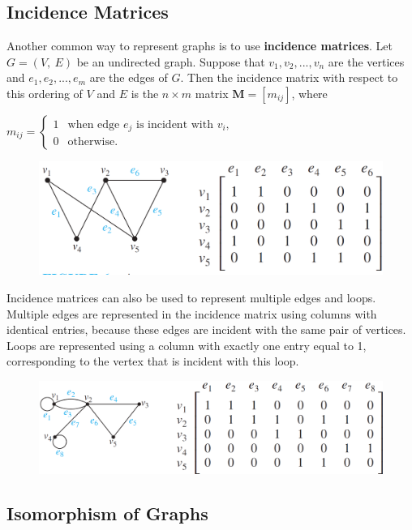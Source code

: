 \documentclass[11pt]{article}
\begin{document}
\subsection{Incidence Matrices}

Another common way to represent graphs is to use \textbf{incidence matrices}. Let $G = (V,\ E)$ be an undirected graph. Suppose that $v_1, v_2, ..., v_n$ are the vertices and $e_1, e_2, ..., e_m$ are the edges of $G$. Then the incidence matrix with respect to this ordering of $V$ and $E$ is the $n \times m$ matrix
$\mathbf{M} = [m_{ij}]$, where

$m_{ij} =
\begin{cases}
    1 & \text{when edge $e_j$ is incident with $v_i$},\\
    0 & \text{otherwise}.
\end{cases}$

\begin{figure}[!h]
    \centering
    \includegraphics[width=.75\textwidth]{img/ch10.3-figure6.png}
    \label{fig:my_label}
\end{figure}

Incidence matrices can also be used to represent multiple edges and loops. Multiple edges are represented in the incidence matrix using columns with identical entries, because these edges are incident with the same pair of vertices. Loops are represented using a column with exactly one entry equal to 1, corresponding to the vertex that is incident with this loop.

\begin{figure}[!h]
    \centering
    \includegraphics[width=.75\textwidth]{img/ch10.3-figure7.png}
    \label{fig:my_label}
\end{figure}

\subsection{Isomorphism of Graphs}
\end{document}
